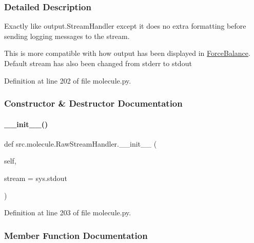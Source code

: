 \subsubsection{Detailed Description}
Exactly like output.\+Stream\+Handler except it does no extra formatting before sending logging messages to the stream. 

This is more compatible with how output has been displayed in \hyperlink{namespaceForceBalance}{Force\+Balance}. Default stream has also been changed from stderr to stdout 

Definition at line 202 of file molecule.\+py.



\subsubsection{Constructor \& Destructor Documentation}
\mbox{\label{classsrc_1_1molecule_1_1RawStreamHandler_a5f47165f46eee9c11ddea1826faaa55c}} 
\paragraph{\texorpdfstring{\+\_\+\+\_\+init\+\_\+\+\_\+()}{\_\_init\_\_()}}
{\footnotesize\ttfamily def src.\+molecule.\+Raw\+Stream\+Handler.\+\_\+\+\_\+init\+\_\+\+\_\+ (\begin{DoxyParamCaption}\item[{}]{self,  }\item[{}]{stream = {\ttfamily sys.stdout} }\end{DoxyParamCaption})}



Definition at line 203 of file molecule.\+py.



\subsubsection{Member Function Documentation}
\mbox{\label{classsrc_1_1molecule_1_1RawStreamHandler_a7994595f5f16fe262528c67505ad4a0e}} 
